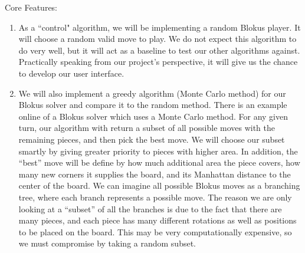 \documentclass[11pt]{article}
\begin{document}
Core Features:
\begin{enumerate}
\item As a ``control" algorithm, we will be implementing a random Blokus player. It will choose a random valid move to play. We do not expect this algorithm to do very well, but it will act as a baseline to test our other algorithms against. Practically speaking from our project's perspective, it will give us the chance to develop our user interface.
\item We will also implement a greedy algorithm (Monte Carlo method) for our Blokus solver and compare it to the random method. There is an example online of a Blokus solver which uses a Monte Carlo method. For any given turn, our algorithm with return a subset of all possible moves with the remaining pieces, and then pick the best move. We will choose our subset smartly by giving greater priority to pieces with higher area. In addition, the ``best'' move will be define by how much additional area the piece covers, how many new corners it supplies the board, and its Manhattan distance to the center of the board. We can imagine all possible Blokus moves as a branching tree, where each branch represents a possible move. The reason we are only looking at a ``subset'' of all the branches is due to the fact that there are many pieces, and each piece has many different rotations as well as positions to be placed on the board. This may be very computationally expensive, so we must compromise by taking a random subset.

\end{enumerate}
\end{document}
